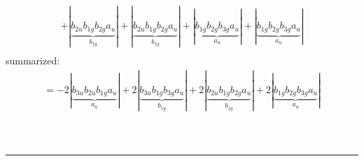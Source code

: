 \documentclass{article}
\begin{document}
\begin{multline*}
+\left|\underbrace{b_{2u} b_{1g} b_{2g} a_{u}}_{b_{1g}}\right|+\left|\underbrace{b_{2u} b_{1g} b_{2g} a_{u}}_{b_{1g}}\right|+\left|\underbrace{b_{1g} b_{2g} b_{3g} a_{u}}_{a_{u}}\right|+\left|\underbrace{b_{1g} b_{2g} b_{3g} a_{u}}_{a_{u}}\right|\\
\end{multline*}summarized:\begin{multline*}
=-2\left|\underbrace{b_{3u} b_{2u} b_{1g} a_{u}}_{a_{u}}\right|+2\left|\underbrace{b_{3u} b_{1g} b_{3g} a_{u}}_{b_{1g}}\right|+2\left|\underbrace{b_{2u} b_{1g} b_{2g} a_{u}}_{b_{1g}}\right|+2\left|\underbrace{b_{1g} b_{2g} b_{3g} a_{u}}_{a_{u}}\right|\\
\end{multline*}\\ \\
\hrule\newpage 
\end{document}
